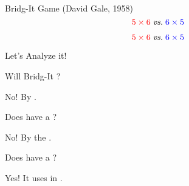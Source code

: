 
\begin{frame}
  \begin{exampleblock}{Bridg-It Game (David Gale, 1958)}
    \[
      \textcolor{red}{5 \times 6} \;\text{\it vs.}\; \textcolor{blue}{6 \times 5}
    \]
  \end{exampleblock}
\end{frame}

\begin{frame}
  \begin{center}
    \vspace{-0.60cm}
    \[
      {\textcolor{red}{5 \times 6} \;\text{\it vs.}\; \textcolor{blue}{6 \times 5}}
    \]
  \end{center}
\end{frame}

\begin{frame}
  \begin{center}
    \href{https://ludii.games/index.php}{}
  \end{center}
\end{frame}

\begin{frame}
  \begin{center}
    {\Large Let's Analyze it!}
  \end{center}
\end{frame}

\begin{frame}
  \begin{center}
    Will Bridg-It ?

    \pause
    \vspace{0.80cm}
    No! By .
  \end{center}
\end{frame}

\begin{frame}{}
  \begin{center}
    Does  have a ?

    \pause
    \vspace{0.80cm}
    No! By the .
  \end{center}
\end{frame}

\begin{frame}{}
  \begin{center}
    Does  have a ?

    \pause
    \vspace{0.80cm}
    Yes! It uses  in .

  \end{center}
\end{frame}
